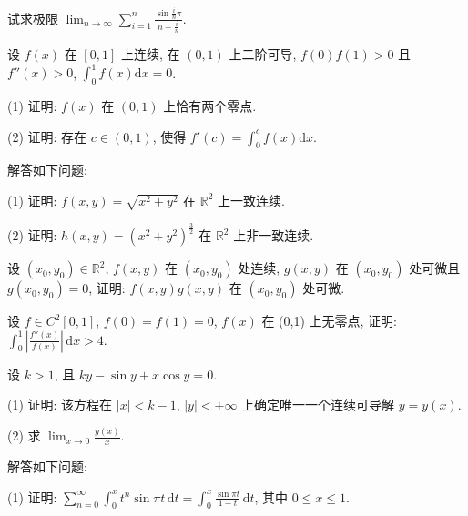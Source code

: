 试求极限 $\lim_{n\to \infty}\sum_{i = 1}^{n}\frac{\sin\frac{i}{n}\pi}{n + \frac{i}{n}}.$\par
设 $f(x)$ 在 $[0,1]$ 上连续, 在 $(0,1)$ 上二阶可导, $f(0)f(1) > 0$ 且 $f''(x) > 0$, $\int_0^1 f(x) \mathrm{d}x = 0$.\par
(1) 证明: $f(x)$ 在 $(0,1)$ 上恰有两个零点.\par
(2) 证明: 存在 $c \in (0,1)$, 使得 $f'(c) = \int_{0}^{c} f(x) \mathrm{d}x$.\par
解答如下问题:\par
(1) 证明: $f(x, y) = \sqrt{x^2 + y^2}$ 在 $\mathbb{R}^2$ 上一致连续.\par
(2) 证明: $h(x, y) = (x^2 + y^2)^{\frac{3}{2}}$ 在 $\mathbb{R}^2$ 上非一致连续.\par
设 $(x_0, y_0) \in \mathbb{R}^2$, $f(x, y)$ 在 $(x_0, y_0)$ 处连续, $g(x, y)$ 在 $(x_0, y_0)$ 处可微且 $g(x_0, y_0) = 0$, 证明: $f(x, y)g(x, y)$ 在 $(x_0, y_0)$ 处可微.\par
设 $f \in C^2[0,1]$, $f(0) = f(1) = 0$, $f(x)$ 在 (0,1) 上无零点, 证明: $\int_0^1 \left| \frac{f''(x)}{f(x)} \right| \, \mathrm{d}x > 4$.\par
设 $k > 1$, 且 $ky - \sin y + x \cos y = 0$.\par
(1) 证明: 该方程在 $|x| < k - 1$, $|y| < +\infty$ 上确定唯一一个连续可导解 $y = y(x)$.\par
(2) 求 $\lim_{x\to 0}\frac{y(x)}{x}$.\par
解答如下问题:\par
(1) 证明: $\sum_{n=0}^{\infty} \int_{0}^{x} t^{n} \sin \pi t \, \mathrm{d}t = \int_{0}^{x} \frac{\sin \pi t}{1 - t} \, \mathrm{d}t$, 其中 $0 \leq x \leq 1$.\par

